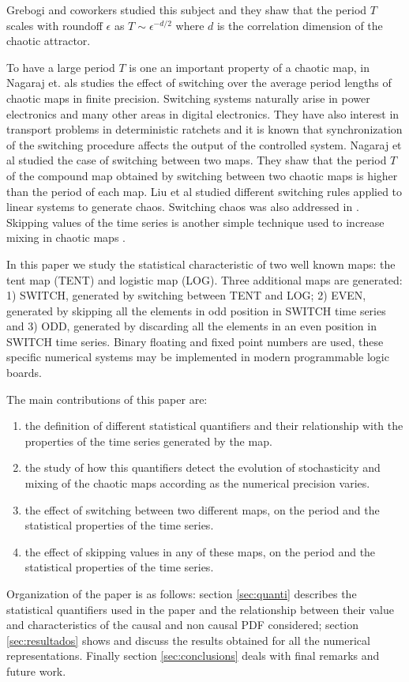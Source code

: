 Grebogi and coworkers \cite{Grebogi1988} studied this subject and they shaw that the period $T$ scales with roundoff $\epsilon$ as $T\sim\epsilon^{-d/2}$ where $d$ is the correlation dimension of the chaotic attractor.

To have a large period $T$ is one an important property of a chaotic map, in \cite{Nagaraj2008} Nagaraj et. als studies the effect of switching over the average period lengths of chaotic maps in finite precision.
Switching systems naturally arise in power electronics and many other areas in digital electronics.
They have also interest in transport problems in deterministic ratchets \cite{Zarlenga2009} and it is known that synchronization of the switching procedure affects the output of the controlled system.
Nagaraj et al \cite{Nagaraj2008} studied the case of switching between two maps.
They shaw that the period $T$ of the compound map obtained by switching between two chaotic maps is higher than the period of each map.
Liu et al \cite{Liu2006} studied different switching rules applied to linear systems to generate chaos.
Switching chaos was also addressed in \cite{Gluskin2008}.
Skipping values of the time series is another simple technique used to increase mixing in chaotic maps \cite{DeMicco2008}.

In this paper we study the statistical characteristic of two well known maps: the tent map (TENT) and logistic map (LOG).
Three additional maps are generated: 1) SWITCH, generated by switching between TENT and LOG; 2) EVEN, generated by skipping all the elements in odd position in SWITCH time series and 3) ODD, generated by discarding all the elements in an even position in SWITCH time series.
Binary floating and fixed point numbers are used, these specific numerical systems may be implemented in modern programmable logic boards.

The main contributions of this paper are:
\begin{enumerate}
\item the definition of different statistical quantifiers and their relationship with the properties of the time series generated by the map.
\item the study of how this quantifiers detect the evolution of stochasticity and mixing of the chaotic maps according as the numerical precision varies.
\item the effect of switching between two different maps, on the period and the statistical properties of the time series.
\item the effect of skipping values in any of these maps, on the period and the statistical properties of the time series.
\end{enumerate}

Organization of the paper is as follows: section \ref{sec:quanti} describes the statistical quantifiers used in the paper and the relationship between their value and characteristics of the causal and non causal PDF considered; section \ref{sec:resultados} shows and discuss the results obtained for all the numerical representations.
Finally section \ref{sec:conclusions} deals with final remarks and future work.